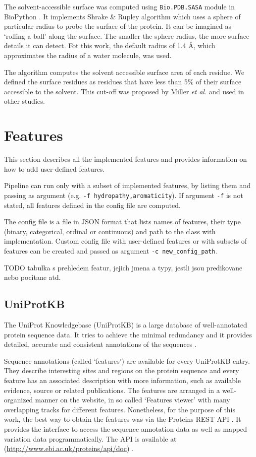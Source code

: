The solvent-accessible surface was computed using \texttt{Bio.PDB.SASA} module in BioPython \cite{sasa}. It implements Shrake \& Rupley algorithm \cite{shrake} which uses a sphere of particular radius to probe the surface of the protein. It can be imagined as `rolling a ball' along the surface. The smaller the sphere radius, the more surface details it can detect. Fot this work, the default radius of 1.4 {\AA}, which approximates the radius of a water molecule, was used.

The algorithm computes the solvent accessible surface area of each residue. We defined the surface residues as residues that have less than 5\% of their surface accessible to the solvent. This cut-off was proposed by Miller \textit{et al.} \cite{sasaCutoff} and used in other studies\cite{jones,lbscomposition}. 

\section{Features}

This section describes all the implemented features and provides information on how to add user-defined features.

Pipeline can run only with a subset of implemented features, by listing them and passing as argument (e.g. \texttt{-f hydropathy,aromaticity}). If argument \texttt{-f} is not stated, all features defined in the config file are computed.

The config file is a file in JSON format that lists names of features, their type (binary, categorical, ordinal or continuous) and path to the class with implementation. Custom config file with user-defined features or with subsets of features can be created and passed as argument \texttt{-c new\_config\_path}.

TODO tabulka s prehledem featur, jejich jmena a typy, jestli jsou predikovane nebo pocitane atd.

\subsection{UniProtKB}

The UniProt Knowledgebase (UniProtKB) is a large database of well-annotated protein sequence data. It tries to achieve the minimal redundancy and it provides detailed, accurate and consistent annotations of the sequences \cite{uniprot}.

Sequence annotations (called `features') are available for every UniProtKB entry. They describe interesting sites and regions on the protein sequence and every feature has an associated description with more information, such as available evidence, source or related publications. The features are arranged in a well-organized manner on the website, in so called `Features viewer' with many overlapping tracks for different features. Nonetheless, for the purpose of this work, the best way to obtain the features was via the Proteins REST API \cite{proteins_api}. It provides the interface to  access the sequence annotation data as well as mapped variation data programmatically. The API is available at (\url{http://www.ebi.ac.uk/proteins/api/doc}) \cite{TODO}.

